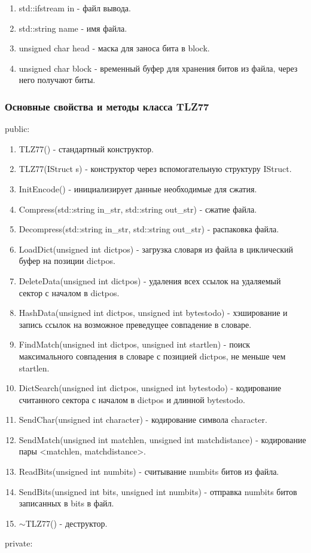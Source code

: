 \documentclass[12pt]{article}
\begin{document}
\begin{enumerate}
	\item std::ifstream in - файл вывода.
    \item std::string name - имя файла.
    \item unsigned char head - маска для заноса бита в block.
    \item unsigned char block - временный буфер для хранения битов из файла, через него получают биты.
\end{enumerate}

\subsubsection*{Основные свойства и методы класса TLZ77}
\noindent
public:

\begin{enumerate}
	\item TLZ77() - стандартный конструктор.
	\item TLZ77(IStruct s) - конструктор через вспомогательную структуру IStruct.
	\item InitEncode() - инициализирует данные необходимые для сжатия.
	\item Compress(std::string in\_str, std::string out\_str) - сжатие файла. 
	\item Decompress(std::string in\_str, std::string out\_str) -  распаковка файла.
	\item LoadDict(unsigned int dictpos) - загрузка словаря из файла в циклический буфер на позиции dictpos.
	\item DeleteData(unsigned int dictpos) - удаления всех ссылок на удаляемый сектор с началом в dictpos.
	\item HashData(unsigned int dictpos, unsigned int bytestodo) - хэширование и запись ссылок на возможное преведущее совпадение в словаре.
	\item FindMatch(unsigned int dictpos, unsigned int startlen) - поиск максимального совпадения в словаре с позицией dictpos, не меньше чем startlen. 
	\item DictSearch(unsigned int dictpos, unsigned int bytestodo) - кодирование считанного сектора с началом в dictpos и длинной bytestodo.
	\item SendChar(unsigned int character) - кодирование символа character.
	\item SendMatch(unsigned int matchlen, unsigned int matchdistance) - кодирование пары <matchlen, matchdistance>.
	\item ReadBits(unsigned int numbits) - считывание numbits битов из файла.
	\item SendBits(unsigned int bits, unsigned int numbits) - отправка numbits битов записанных в bits в файл.
	\item $\sim$TLZ77() - деструктор.
\end{enumerate}
\noindent
private:
\end{document}
